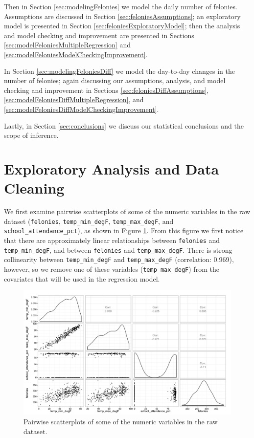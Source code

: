 \documentclass[11pt,notitlepage]{article}
\begin{document}
Then in Section \ref{sec:modelingFelonies} we model the daily number of felonies. Assumptions are discussed in Section \ref{sec:feloniesAssumptions}; an exploratory model is presented in Section \ref{sec:feloniesExploratoryModel}; then the analysis and model checking and improvement are presented in Sections \ref{sec:modelFeloniesMultipleRegression} and \ref{sec:modelFeloniesModelCheckingImprovement}.

In Section \ref{sec:modelingFeloniesDiff} we model the day-to-day changes in the number of felonies; again discussing our assumptions, analysis, and model checking and improvement in Sections \ref{sec:feloniesDiffAssumptions}, \ref{sec:modelFeloniesDiffMultipleRegression}, and \ref{sec:modelFeloniesDiffModelCheckingImprovement}.

Lastly, in Section \ref{sec:conclusions} we discuss our statistical conclusions and the scope of inference.





\section{Exploratory Analysis and Data Cleaning}
\label{sec:eda}

We first examine pairwise scatterplots of some of the numeric variables in the raw dataset (\texttt{felonies}, \texttt{temp_min_degF}, \texttt{temp_max_degF}, and \texttt{school_attendance_pct}), as shown in Figure \ref{fig:pairsNumericExclAcc}. From this figure we first notice that there are approximately linear relationships between \texttt{felonies} and \texttt{temp_min_degF}, and between \texttt{felonies} and \texttt{temp_max_degF}. There is strong collinearity between \texttt{temp_min_degF} and \texttt{temp_max_degF} (correlation: 0.969), however, so we remove one of these variables (\texttt{temp_max_degF}) from the covariates that will be used in the regression model.

\begin{figure}[!h]
	\centering
	\captionsetup{width=0.9\textwidth}
	\includegraphics[width=6in]{figures/pairsNumericExclAcc.png}
	\vspace*{-3mm}
	\caption{Pairwise scatterplots of some of the numeric variables in the raw dataset.}
	\label{fig:pairsNumericExclAcc}
	\vspace*{-3mm}
\end{figure}
\end{document}
